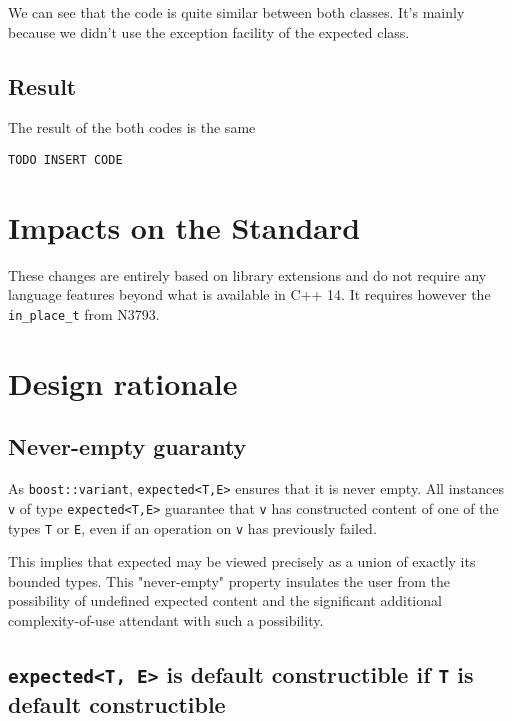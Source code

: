 \documentclass[a4paper,10pt]{article}
\newcommand{\cpp}[1]{\lstinline{#1}}
\begin{document}
We can see that the code is quite similar between both classes. It's mainly because we didn't use the exception facility of the expected class.

\subsection{Result}

The result of the both codes is the same 

\begin{lstlisting}
TODO INSERT CODE
\end{lstlisting}

\section{Impacts on the Standard}

These changes are entirely based on library extensions and do not require any language features beyond what is available in C++ 14. It requires however the \cpp{in_place_t} from N3793.

\section{Design rationale}


\subsection{Never-empty guaranty}

As \cpp{boost::variant}, \cpp{expected<T,E>} ensures that it is never empty.
All instances \cpp{v} of type \cpp{expected<T,E>} guarantee that \cpp{v} has constructed content of one of the types \cpp{T} or \cpp{E}, even if an operation on \cpp{v} has previously failed.

This implies that expected may be viewed precisely as a union of exactly its bounded types. This "never-empty" property insulates the user from the possibility of undefined expected content and the significant additional complexity-of-use attendant with such a possibility.

\subsection{\cpp{expected<T, E>} is default constructible if \cpp{T} is default constructible}
\end{document}
